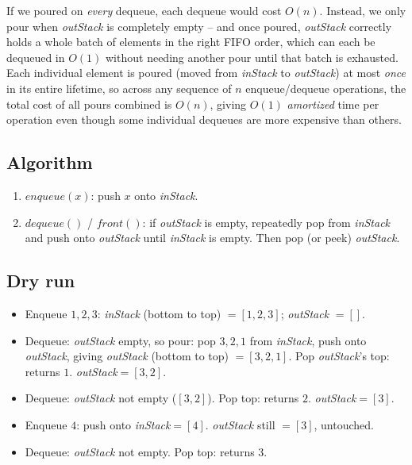 If we poured on \emph{every} dequeue, each dequeue would cost $O(n)$.
Instead, we only pour when \textit{outStack} is completely empty -- and
once poured, \textit{outStack} correctly holds a whole batch of elements
in the right FIFO order, which can each be dequeued in $O(1)$ without
needing another pour until that batch is exhausted. Each individual
element is poured (moved from \textit{inStack} to \textit{outStack}) at
most \emph{once} in its entire lifetime, so across any sequence of $n$
enqueue/dequeue operations, the total cost of all pours combined is
$O(n)$, giving $O(1)$ \emph{amortized} time per operation even though some
individual dequeues are more expensive than others.

\subsection*{Algorithm}

\begin{enumerate}
  \item $\textit{enqueue}(x)$: push $x$ onto \textit{inStack}.
  \item $\textit{dequeue}()$ / $\textit{front}()$: if \textit{outStack}
        is empty, repeatedly pop from \textit{inStack} and push onto
        \textit{outStack} until \textit{inStack} is empty. Then pop (or
        peek) \textit{outStack}.
\end{enumerate}

\subsection*{Dry run}


\begin{itemize}
  \item Enqueue $1,2,3$: \textit{inStack} (bottom to top) $=[1,2,3]$;
        \textit{outStack} $=[]$.
  \item Dequeue: \textit{outStack} empty, so pour: pop $3,2,1$ from
        \textit{inStack}, push onto \textit{outStack}, giving
        \textit{outStack} (bottom to top) $=[3,2,1]$. Pop \textit{outStack}'s
        top: returns $1$. \textit{outStack}$=[3,2]$.
  \item Dequeue: \textit{outStack} not empty ($[3,2]$). Pop top: returns
        $2$. \textit{outStack}$=[3]$.
  \item Enqueue $4$: push onto \textit{inStack}$=[4]$.
        \textit{outStack} still $=[3]$, untouched.
  \item Dequeue: \textit{outStack} not empty. Pop top: returns $3$.
\end{itemize}

